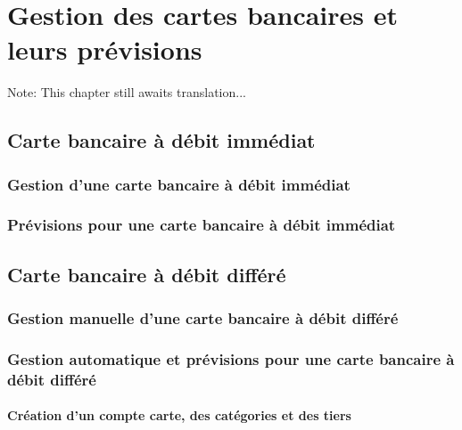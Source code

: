 
\chapter{Gestion des cartes bancaires et leurs prévisions\label{bankcard} }

Note: This chapter still awaits translation...

\section{Carte bancaire à débit immédiat\label{bankcard-quickCard}}

\subsection{Gestion d'une carte bancaire à débit immédiat\label{bankcard-quickCard-manage}}

\subsection{Prévisions pour une carte bancaire à débit immédiat\label{bankcard-quickCard-budget}}


\section{Carte bancaire à débit différé\label{bankcard-deferredCard}}


\subsection{Gestion manuelle d'une carte bancaire à débit différé\label{bankcard-deferredCard-manage}}


\subsection{Gestion automatique et prévisions pour une carte bancaire à débit différé\label{bankcard-deferredCard-budget}}


\subsubsection{Création d'un compte carte, des catégories et des tiers}


